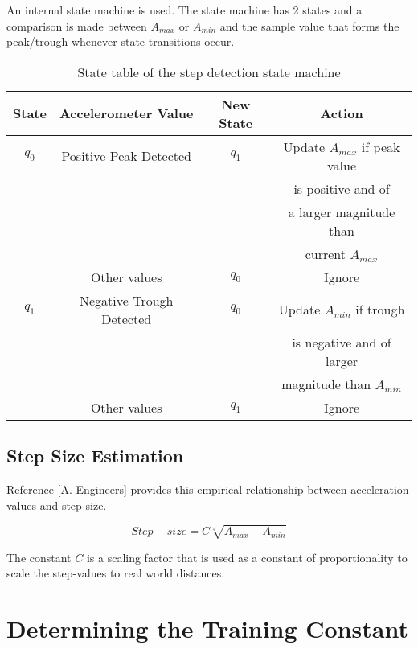 An internal state machine is used. The state machine has 2 states and a comparison
is made between $A_{max}$ or $A_{min}$ and the sample value that forms the peak/trough
whenever state transitions occur.

\begin{table}[h]\centering
    \caption{State table of the step detection state machine\label{tbl:peak_valley_state_table}}
    \begin{tabular}{cccc} \hline
    State & Accelerometer Value     & New State &  Action\\     \hline
    $q_0$ & Positive Peak Detected  & $q_1$     & Update $A_{max}$ if peak value  \\ 
          &                         &           & is positive and of \\
          &                         &           & a larger magnitude than \\
          &                         &           & current $A_{max}$ \\
          & Other values            & $q_0$     & Ignore \\         \hline
    $q_1$ & Negative Trough Detected & $q_0$    & Update $A_{min}$ if trough \\
          &                         &           & is negative and of larger \\ 
          &                         &           & magnitude than $A_{min}$ \\
          & Other values            & $q_1$     & Ignore \\ \hline
    \end{tabular}
\end{table}
\subsection{Step Size Estimation}

Reference [A. Engineers] provides this empirical relationship between acceleration
values and step size.

\begin{equation}
 Step-size = C \sqrt[4]{A_{max} - A_{min}}
\end{equation}

The constant $C$ is a scaling factor that is used as a constant of proportionality
to scale the step-values to real world distances.

\section{Determining the Training Constant}

